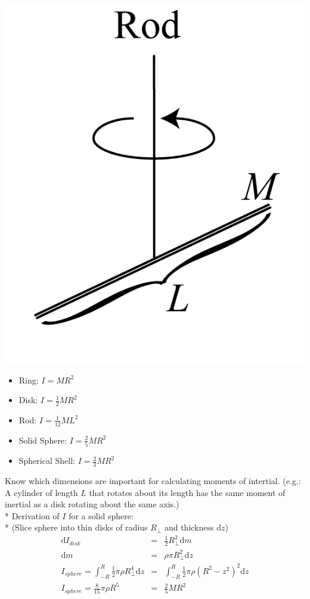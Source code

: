 \begin{center}
 \includegraphics[scale=0.5]{images/PGRE_Figures_1p1p2_Rod.png}
 \end{center}
\begin{itemize}
\item Ring: \(I=MR^2\)
\item Disk: \(I=\frac{1}{2}MR^2\)
\item Rod: \(I=\frac{1}{12}ML^2\)
\item Solid Sphere: \(I=\frac{2}{5}MR^2\)
\item Spherical Shell: \(I=\frac{2}{3}MR^2\)
\end{itemize}
Know which dimensions are important for calculating moments of intertial.
(e.g.: A cylinder of length \(L\) that rotates about its length has the same moment of inertial as a disk rotating about the same axis.)\\*
Derivation of \(I\) for a solid sphere: \\*
(Slice sphere into thin disks of radius \(R_{\bot}\) and thickness \(\mathrm{d}z\))
\begin{eqnarray}
\mathrm{d}I_{disk}&=&\frac{1}{2}R_{\bot}^2\mathrm{d}m \nonumber \\
\mathrm{d}m &=& \rho\pi R_{\bot}^2\mathrm{d}z \nonumber \\
I_{sphere}=\int_{-R}^{R}\frac{1}{2}\pi\rho R_{\bot}^4\mathrm{d}z &=& \int_{-R}^{R}\frac{1}{2}\pi\rho (R^2-z^2)^2\mathrm{d}z \nonumber \\
I_{sphere}=\frac{8}{15}\pi\rho R^5 &=& \frac{2}{5}MR^2 \nonumber
\end{eqnarray}
